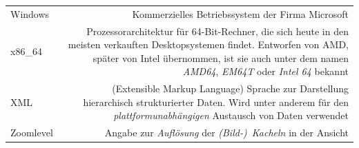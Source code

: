 \documentclass[10pt]{scrreprt}
\newcommand{\textref}[1]{\mbox{\raisebox{0.1ex}{\small$\rightarrow$ }\textit{#1}}}
\begin{document}
\begin{longtabu}{L{0.35} R{1.65}}
Windows & Kommerzielles Betriebssystem der Firma Microsoft\\
x86\_64 & Prozessorarchitektur für 64-Bit-Rechner, die sich heute in den meisten verkauften Desktopsystemen findet. Entworfen von AMD, später von Intel übernommen, ist sie auch unter dem namen \textit{AMD64}, \textit{EM64T} oder \textit{Intel 64} bekannt\\
XML & (Extensible Markup Language) Sprache zur Darstellung hierarchisch strukturierter Daten. Wird unter anderem für den \textref{plattformunabhängigen} Austausch von Daten verwendet\\
Zoomlevel & Angabe zur \textref{Auflösung} der \textref{(Bild-) Kacheln} in der Ansicht\\
\end{longtabu}
\end{document}
